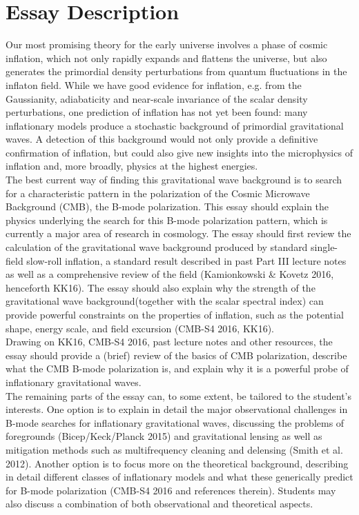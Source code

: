 \documentclass[a4paper,10pt]{article}
\begin{document}
\section{Essay Description}
Our most promising theory for the early universe involves a phase of cosmic inflation, which not only rapidly expands and flattens the universe, but also generates the primordial density perturbations from quantum fluctuations in the inflaton field. While we have good evidence for inflation, e.g. from the Gaussianity, adiabaticity and near-scale invariance of the scalar density perturbations, one prediction of inflation has not yet been found: many inflationary models produce a stochastic background of primordial gravitational waves. A detection of this background would not only provide a definitive confirmation of inflation, but could also give new insights into the microphysics of inflation and, more broadly, physics at the highest energies.\\

The best current way of finding this gravitational wave background is to search for a characteristic pattern in the polarization of the Cosmic Microwave Background (CMB), the B-mode polarization. This essay should explain the physics underlying the search for this B-mode polarization pattern, which is currently a major area of research in cosmology.
The essay should first review the calculation of the gravitational wave background produced
by standard single-field slow-roll inflation, a standard result described in past Part III lecture notes as well as a comprehensive review of the field (Kamionkowski \& Kovetz 2016, henceforth KK16). The essay should also explain why the strength of the gravitational wave background(together with the scalar spectral index) can provide powerful constraints on the properties of inflation, such as the potential shape, energy scale, and field excursion (CMB-S4 2016, KK16).\\

Drawing on KK16, CMB-S4 2016, past lecture notes and other resources, the essay should provide a (brief) review of the basics of CMB polarization, describe what the CMB B-mode polarization is, and explain why it is a powerful probe of inflationary gravitational waves.\\

The remaining parts of the essay can, to some extent, be tailored to the student’s interests. One option is to explain in detail the major observational challenges in B-mode searches for inflationary gravitational waves, discussing the problems of foregrounds (Bicep/Keck/Planck 2015) and gravitational lensing as well as mitigation methods such as multifrequency cleaning and delensing (Smith et al. 2012). Another option is to focus more on the theoretical background, describing in detail different classes of inflationary models and what these generically predict for B-mode polarization (CMB-S4 2016 and references therein). Students may also discuss a combination of both observational and theoretical aspects.\\
\end{document}
